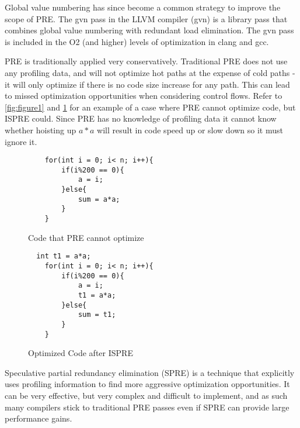 \documentclass[sigplan,screen]{acmart}
\begin{document}
    Global value numbering has since become a common strategy to improve the scope of PRE. The gvn pass in the LLVM compiler (gvn) is a library pass that combines global value numbering with redundant load elimination. The gvn pass is included in the O2 (and higher) levels of optimization in clang and gcc.

    PRE is traditionally applied very conservatively. Traditional PRE does not use any profiling data, and will not optimize hot paths at the expense of cold paths - it will only optimize if there is no code size increase for any path. This can lead to missed optimization opportunities when considering control flows. Refer to \ref{fig:figure1} and \ref{fig:figure2} for an example of a case where PRE cannot optimize code, but ISPRE could. Since PRE has no knowledge of profiling data it cannot know whether hoisting up \(a*a\) will result in code speed up or slow down so it must ignore it.
    
    \begin{figure}[ht]
    \begin{minipage}[b]{0.45\linewidth}
    \centering
    \begin{small}
    \begin{verbatim}
    for(int i = 0; i< n; i++){
        if(i%200 == 0){
            a = i;
        }else{
            sum = a*a;
        }
    }
    \end{verbatim}
    \end{small}
    \caption{Code that PRE cannot optimize}
    \label{fig:figure1}
    \end{minipage}
    \hspace{0.5cm}
    \begin{minipage}[b]{0.45\linewidth}
    \centering
    \begin{small}
    \begin{verbatim}
  int t1 = a*a;
    for(int i = 0; i< n; i++){
        if(i%200 == 0){
            a = i;
            t1 = a*a;
        }else{
            sum = t1;
        }
    }
    \end{verbatim}
    \end{small}
    \caption{Optimized Code after ISPRE}
    \label{fig:figure2}
    \end{minipage}
    \end{figure}

    Speculative partial redundancy elimination (SPRE) is a technique that explicitly uses profiling information to find more aggressive optimization opportunities. It can be very effective, but very complex and difficult to implement, and as such many compilers stick to traditional PRE passes even if SPRE can provide large performance gains.
\end{document}
